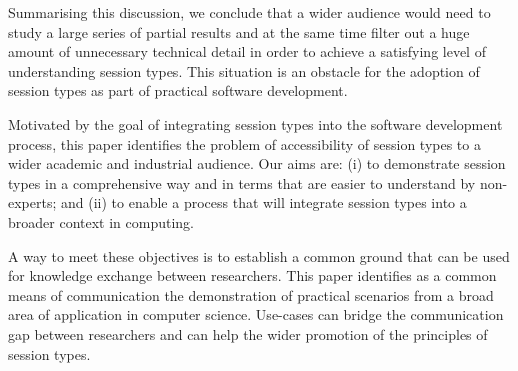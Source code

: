 %
Summarising this discussion, we conclude that a wider
audience would need to study a large series of partial
results and at the same time filter out a huge amount
of unnecessary technical detail in order to achieve a satisfying
level of understanding session types. This situation is an obstacle for
the adoption of session types as part of practical software development.


Motivated by the goal of integrating session types into
the software development process, this paper identifies the problem of accessibility
of session types to a wider academic and industrial audience. 
Our aims are:
(i) to demonstrate session types in a comprehensive way and in
terms that are easier to understand by non-experts; and
(ii) to enable a process that will
integrate session types into a broader context in computing.

A way to meet these objectives is to establish a common
ground that can be used for knowledge exchange between researchers.
This paper identifies as a common means of communication the demonstration
of practical scenarios from a broad area of application in computer science.
Use-cases can bridge the communication gap between researchers and can help
the wider promotion of the principles of session types.


